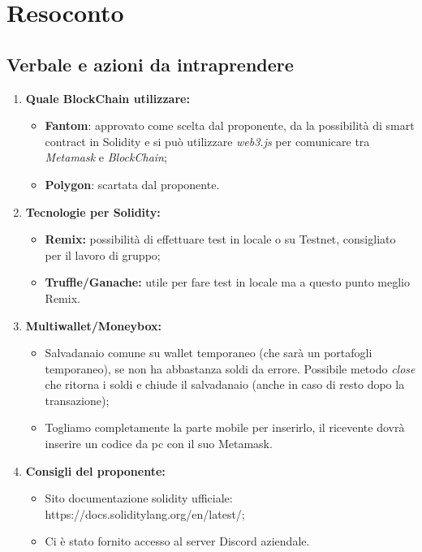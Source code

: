 \section{Resoconto}
\subsection{Verbale e azioni da intraprendere}

\begin{enumerate}
	\item \textbf{Quale BlockChain\glo{} utilizzare:}
	\begin{itemize}
		\item \textbf{Fantom\glo{}}: approvato come scelta dal proponente, da la possibilità di smart contract\glo{} in Solidity\glo{} e si può utilizzare \textit{web3.js}\glo{} per comunicare tra \textit{Metamask}\glo{} e \textit{BlockChain}\glo{};
		\item \textbf{Polygon\glo{}}: scartata dal proponente.
	\end{itemize}
	\item \textbf{Tecnologie per Solidity\glo{}:}
	\begin{itemize}
		\item \textbf{Remix\glo{}:} possibilità di effettuare test in locale o su Testnet, consigliato per il lavoro di gruppo;
		\item \textbf{Truffle\glo/Ganache\glo{}:} utile per fare test in locale ma a questo punto meglio Remix\glo{}.
	\end{itemize}
	\item \textbf{Multiwallet/Moneybox\glo{}:} 
	\begin{itemize}
		\item Salvadanaio comune su wallet\glo{} temporaneo (che sarà un portafogli temporaneo), se non ha abbastanza soldi da errore. Possibile metodo \textit{close} che ritorna i soldi e chiude il salvadanaio (anche in caso di resto dopo la transazione);
		\item Togliamo completamente la parte mobile per inserirlo, il ricevente dovrà inserire un codice da pc con il suo Metamask\glo{}.
	\end{itemize}
	\item \textbf{Consigli del proponente:}
	\begin{itemize}
		\item Sito documentazione solidity\glo{} ufficiale: https://docs.soliditylang.org/en/latest/;
		\item Ci è stato fornito accesso al server Discord\glo{} aziendale.
	\end{itemize}
	
\end{enumerate}

